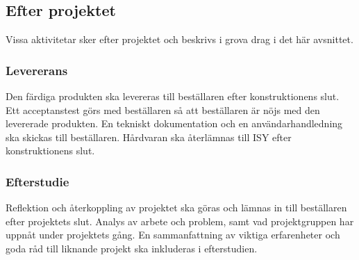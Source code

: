 \documentclass[projektplan/plan.tex]{subfiles}
\begin{document}
\subsection{Efter projektet}
Vissa aktivitetar sker efter projektet och beskrivs i grova drag i det här
avsnittet.
\subsubsection*{Levererans}
Den färdiga produkten ska levereras till beställaren efter konstruktionens
slut. Ett acceptanstest görs med beställaren så att beställaren är nöjs med den
levererade produkten. En tekniskt dokumentation och en användarhandledning ska
skickas till beställaren. Hårdvaran ska återlämnas till ISY efter
konstruktionens slut.
\subsubsection*{Efterstudie}
Reflektion och återkoppling av projektet ska göras och lämnas in till
beställaren efter projektets slut. Analys av arbete och problem, samt vad
projektgruppen har uppnåt under projektets gång. En sammanfattning av viktiga
erfarenheter och goda råd till liknande projekt ska inkluderas i efterstudien.
\end{document}
